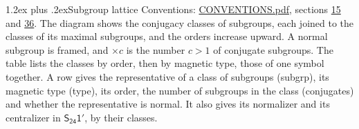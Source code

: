 \documentclass[10pt,a4paper]{article}
\makeatletter
\renewcommand\section{\@startsection{section}{1}{\z@}{-3ex plus -1ex minus -.2ex}%
  {1.2ex plus .2ex}{\normalfont\large\sffamily\bfseries\color{parttitle}}}
\numberwithin{equation}{section}
\newcommand{\grp}[1]{\mathsf{#1}}
\makeatother
\begin{document}
\section{Subgroup lattice}\label{s:subgroups}
Conventions: \href{../../CONVENTIONS.pdf}{CONVENTIONS.pdf}, sections \href{../../../rotation/CONVENTIONS.pdf\#conv.15}{15} and \href{../../CONVENTIONS.pdf\#conv.36}{36}.
The diagram shows the conjugacy classes of subgroups, each joined to the classes of its maximal subgroups, and the orders increase upward. \label{n:index.conjugates.c}A normal subgroup is framed, and ${\times}c$ is the number $c > 1$ of conjugate subgroups. The table lists the classes by order, then by magnetic type, those of one symbol together. \label{n:head.subgroup}\label{n:head.magnetic.type}\label{n:head.order}\label{n:head.conjugates}\label{n:head.normal}A row gives the representative of a class of subgroups (subgrp), its magnetic type (type), its order, the number of subgroups in the class (conjugates) and whether the representative is normal. \label{n:head.normalizer}\label{n:head.centralizer}It also gives its normalizer and its centralizer in $\grp{S_{24}1'}$, by their classes. 
\end{document}
